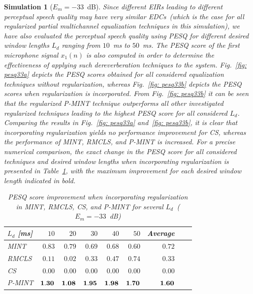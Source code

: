 \documentclass[10pt]{IEEEtran}
\newtheorem{simulation}{Simulation}
\begin{document}
\begin{simulation}[$E_m=-33$~dB]
Since different EIRs leading to different perceptual speech quality may have very similar EDCs~(which is the case for all regularized partial multichannel equalization techniques in this simulation), we have also evaluated the perceptual speech quality using PESQ for different desired window lengths $L_d$ ranging from $10$~ms to $50$~ms.
The PESQ score of the first microphone signal $x_1(n)$ is also computed in order to determine the effectiveness of applying such dereverberation techniques to the system.
Fig.~\ref{fig: pesq33a} depicts the PESQ scores obtained for all considered equalization techniques without regularization, whereas Fig.~\ref{fig: pesq33b} depicts the PESQ scores when regularization is incorporated.
From Fig.~\ref{fig: pesq33b} it can be seen that the regularized P-MINT technique outperforms all other investigated regularized techniques leading to the highest PESQ score for all considered $L_d$.
Comparing the results in Fig.~\ref{fig: pesq33a} and~\ref{fig: pesq33b}, it is clear that incorporating regularization yields no performance improvement for CS, whereas the performance of MINT, RMCLS, and P-MINT is increased.
For a precise numerical comparison, the exact change in the PESQ score for all considered techniques and desired window lengths when incorporating regularization is presented in Table~\ref{tbl: pesq1}, with the maximum improvement for each desired window length indicated in bold.
\begin{table}[b!]
\centering
\caption{PESQ score improvement when incorporating regularization in MINT, RMCLS, CS, and P-MINT for several $L_d$~($E_m = -33$~dB)}
\label{tbl: pesq1}
\begin{tabular}{|l|r|r|r|r|r|r|r|r|}
\hline
$L_d$ [ms] & $10$ & $20$ & $30$ & $40$ & $50$ & Average  \\
\hline
MINT & $0.83$ & $0.79$ & $0.69$ & $0.68$ & $0.60$ & $0.72$ \\
\hline
RMCLS & $0.11$ & $0.02$ & $0.33$ & $0.47$ & $0.74$ & $0.33$ \\
\hline
CS & $0.00$ & $0.00$ & $0.00$ & $0.00$ & $0.00$ & $0.00$ \\
\hline
P-MINT & $\bf{1.30}$ & $\bf{1.08}$ & $\bf{1.95}$ & $\bf{1.98}$ & $\bf{1.70}$ & $\bf{1.60}$ \\
\hline
\end{tabular}
\end{table}
\begin{figure}[t!]
\centering
\hbox{\subfloat[\label{fig: edcnoreg15a}]{%
}}
\end{figure}
\end{simulation}
\end{document}
